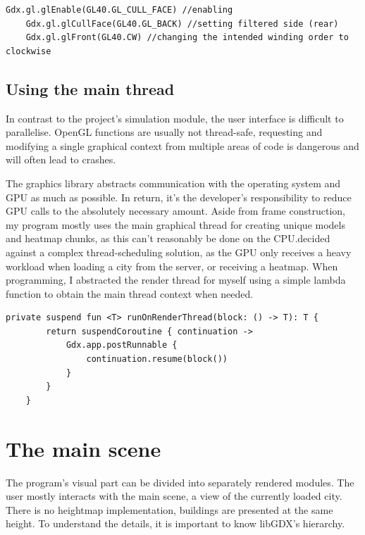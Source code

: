 \begin{lstlisting}[caption=Example for changing OpenGL's culling properties through libGDX]
    Gdx.gl.glEnable(GL40.GL_CULL_FACE) //enabling
    Gdx.gl.glCullFace(GL40.GL_BACK) //setting filtered side (rear)
    Gdx.gl.glFront(GL40.CW) //changing the intended winding order to clockwise
\end{lstlisting}

\subsection{Using the main thread}

In contrast to the project's simulation module, the user interface is difficult to parallelise. OpenGL functions are usually not thread-safe, requesting and modifying a single graphical context from multiple areas of code is dangerous and will often lead to crashes.

The graphics library abstracts communication with the operating system and GPU as much as possible. In return, it's the developer's responsibility to reduce GPU calls to the absolutely necessary amount. Aside from frame construction, my program mostly uses the main graphical thread for creating unique models and heatmap chunks, as this can't reasonably be done on the CPU.\@I decided against a complex thread-scheduling solution, as the GPU only receives a heavy workload when loading a city from the server, or receiving a heatmap. When programming, I abstracted the render thread for myself using a simple lambda function to obtain the main thread context when needed.

\begin{lstlisting}[caption=Helper function for getting the draw thread]
private suspend fun <T> runOnRenderThread(block: () -> T): T {
        return suspendCoroutine { continuation ->
            Gdx.app.postRunnable {
                continuation.resume(block())
            }
        }
    }
\end{lstlisting}


\section{The main scene}
The program's visual part can be divided into separately rendered modules. The user mostly interacts with the main scene, a view of the currently loaded city. There is no heightmap implementation, buildings are presented at the same height. To understand the details, it is important to know libGDX's hierarchy.\cite{LibgdxModels}

